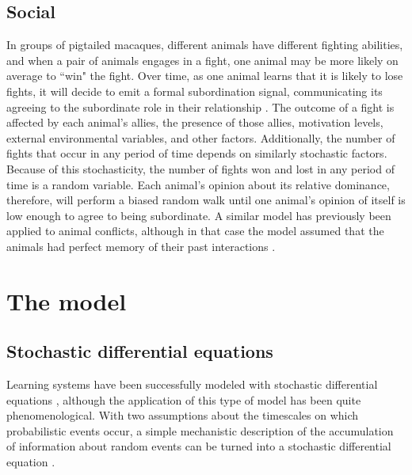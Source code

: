\documentclass{article}
\begin{document}
\subsection{Social }
In groups of pigtailed macaques, different animals have different fighting abilities, and when a pair of animals engages in a fight, one animal may be more likely on average to ``win" the fight.  Over time, as one animal learns that it is likely to lose fights, it will decide to emit a formal subordination signal, communicating its agreeing to the subordinate role in their relationship \citep{Flack:2007kx, Flack:2006fk,Flack:2004oq, Waal:1985fk,Caldecott:1986uk}.  The outcome of a fight is affected by each animal's allies, the presence of those allies, motivation levels,  external environmental variables, and other factors.  Additionally, the number of fights that occur in any period of time depends on similarly stochastic factors.  Because of this stochasticity, the number of fights won and lost in any period of time is a random variable.  Each animal's opinion about its relative dominance, therefore, will perform a biased random walk until one animal's opinion of itself is low enough to agree to being subordinate.  A similar model has previously been applied to animal conflicts, although in that case the model assumed that the animals had perfect memory of their past interactions \citep{Froment:2010fk}.


\section{The model \label{derivation}}
\subsection{Stochastic differential equations }
Learning systems have been successfully modeled with stochastic differential equations \citep{Eckhoff:2008uq, Brown:2005fk,Feng:2009kl,Bogacz:2006uq}, although the application of this type of model has been quite phenomenological.  With two assumptions about the timescales on which probabilistic events occur, a simple mechanistic description of the accumulation of information about random events can be turned into a stochastic differential equation \cite{Gillespie:2000fk}.  

\end{document}
